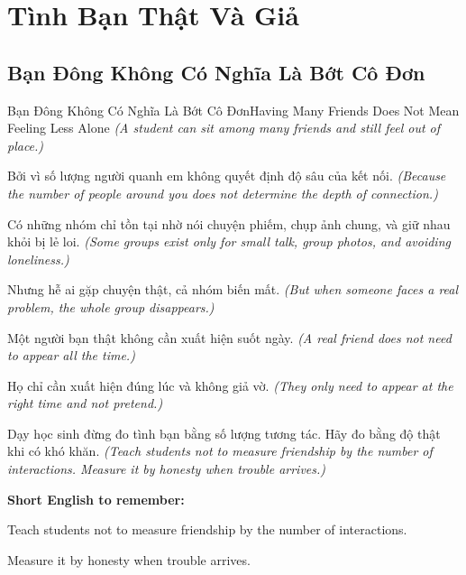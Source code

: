 \chapter{Tình Bạn Thật Và Giả}

\section{Bạn Đông Không Có Nghĩa Là Bớt Cô Đơn}
\begin{truyen}{Bạn Đông Không Có Nghĩa Là Bớt Cô Đơn}{Having Many Friends Does Not Mean Feeling Less Alone}
\textit{(A student can sit among many friends and still feel out of place.)}

Bởi vì số lượng người quanh em không quyết định độ sâu của kết nối.
\textit{(Because the number of people around you does not determine the depth of connection.)}

Có những nhóm chỉ tồn tại nhờ nói chuyện phiếm, chụp ảnh chung, và giữ nhau khỏi bị lẻ loi.
\textit{(Some groups exist only for small talk, group photos, and avoiding loneliness.)}

Nhưng hễ ai gặp chuyện thật, cả nhóm biến mất.
\textit{(But when someone faces a real problem, the whole group disappears.)}

Một người bạn thật không cần xuất hiện suốt ngày.
\textit{(A real friend does not need to appear all the time.)}

Họ chỉ cần xuất hiện đúng lúc và không giả vờ.
\textit{(They only need to appear at the right time and not pretend.)}

\end{truyen}

\begin{baihoc}
Dạy học sinh đừng đo tình bạn bằng số lượng tương tác. Hãy đo bằng độ thật khi có khó khăn.
\textit{(Teach students not to measure friendship by the number of interactions. Measure it by honesty when trouble arrives.)}
\end{baihoc}

\begin{ghinhoanh}
\textbf{Short English to remember:}

Teach students not to measure friendship by the number of interactions.

Measure it by honesty when trouble arrives.

\end{ghinhoanh}

